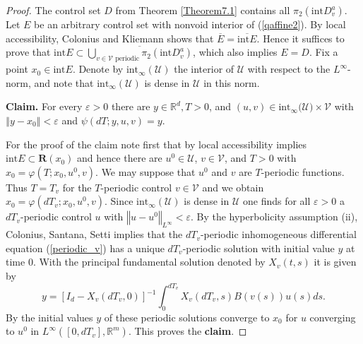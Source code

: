 \documentclass{siamltex}%
\begin{document}
\begin{proof}
The control set $D$ from Theorem \ref{Theorem7.1} contains all $\pi
_{2}(\mathrm{int}D_{v}^{a})$. Let $E$ be an arbitrary control set with nonvoid
interior of (\ref{qaffine2}). By local accessibility, Colonius and Kliemann
\cite[Lemma 3.2.13(i)]{ColK00} shows that $\overline{E}=\overline
{\mathrm{int}E}$. Hence it suffices to prove that $\mathrm{int}E\subset
\overline{\bigcup\nolimits_{v\in\mathcal{V}\text{ periodic}}\pi_{2}%
(\mathrm{int}D_{v}^{a})}$, which also implies $E=D$. Fix a point $x_{0}%
\in\mathrm{int}E$. Denote by $\mathrm{int}_{\infty}(\mathcal{U})$ the interior
of $\mathcal{U}$ with respect to the $L^{\infty}$-norm, and note that
$\mathrm{int}_{\infty}(\mathcal{U})$ is dense in $\mathcal{U}$ in this norm.

\textbf{Claim.} For every $\varepsilon>0$ there are $y\in\mathbb{R}^{d},T>0$,
and $(u,v)\in\mathrm{int}_{\infty}(\mathcal{U)}\times\mathcal{V}$ with
$\left\Vert y-x_{0}\right\Vert <\varepsilon$ and $\psi(dT;y,u,v)=y$.

For the proof of the claim note first that by local accessibility \cite[Lemma
3.2.13(iii)]{ColK00} implies $\mathrm{int}E\subset\mathbf{R}(x_{0})$ and hence
there are $u^{0}\in\mathcal{U}$, $v\in\mathcal{V}$, and $T>0$ with
$x_{0}=\varphi(T;x_{0},u^{0},v)$. We may suppose that $u^{0}$ and $v$ are
$T$-periodic functions. Thus $T=T_{v}$ for the $T$-periodic control
$v\in\mathcal{V}$ and we obtain $x_{0}=\varphi(dT_{v};x_{0},u^{0},v)$. Since
$\mathrm{int}_{\infty}(\mathcal{U})$ is dense in $\mathcal{U}$ one finds for
all $\varepsilon>0$ a $dT_{v}$-periodic control $u$ with $\left\Vert
u-u^{0}\right\Vert _{L^{\infty}}<\varepsilon$. By the hyperbolicity assumption
(ii), Colonius, Santana, Setti \cite[Proposition 2.9(i)]{ColSS22} implies that
the $dT_{v}$-periodic inhomogeneous differential equation (\ref{periodic_v})
has a unique $dT_{v}$-periodic solution with initial value $y$ at time $0$.
With the principal fundamental solution denoted by $X_{v}(t,s)$ it is given by%
\[
y=\left[  I_{d}-X_{v}(dT_{v},0)\right]  ^{-1}\int_{0}^{dT_{v}}X_{v}%
(dT_{v},s)B(v(s))u(s)ds.
\]
By \cite[Proposition 2.9(iv)]{ColSS22} the initial values $y$ of these
periodic solutions converge to $x_{0}$ for $u$ converging to $u^{0}$ in
$L^{\infty}([0,dT_{v}],\mathbb{R}^{m})$. This proves the \textbf{claim}.


\end{proof}
\end{document}
